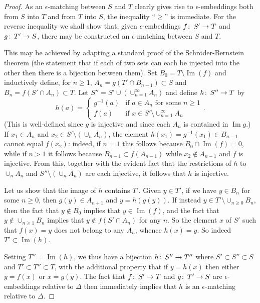 \documentclass[11pt]{amsart}
\theoremstyle{definition}
\theoremstyle{remark}
\numberwithin{equation}{section}
\def\co{\colon\thinspace}
\def\ep{\epsilon}
\DeclareMathOperator{\Img}{Im}
\begin{document}
\begin{proof}
	As an $\ep$-matching between $S$ and $T$ clearly gives rise to $\ep$-embeddings both from $S$ into $T$ and from $T$ into $S$, the inequality ``$\geq$'' is immediate.  For the reverse inequality we shall show that, given $\ep$-embeddings $f\co S'\to T$ and $g\co T'\to S$, there may be constructed an $\ep$-matching between $S$ and $T$.
	
	This may be achieved by adapting a standard proof of the Schr\"oder-Bernstein theorem (the statement that if each of two sets can each be injected into the other then there is a bijection between them). Set $B_0=T\setminus \Img(f)$ and inductively define, for $n\geq 1$, $A_n=g(T'\cap B_{n-1})\subset S$ and $B_n=f(S'\cap A_{n})\subset T$.  Let $S''=S'\cup\left(\cup_{n=1}^{\infty}A_n\right)$ and define $h\co S''\to T$ by \[ h(a)=\left\{\begin{array}{ll} g^{-1}(a) & \mbox{if }a\in A_n\mbox{ for some }n\geq 1 \\ f(a) & \mbox{if $x\in S'\setminus\cup_{n=1}^{\infty}A_n$}  \end{array}\right..  \]  (This is well-defined since $g$ is injective and since each $A_n$ is contained in $\Img g$.)   If $x_1\in A_n$ and $x_2\in S'\setminus(\cup_n A_n)$, the element $h(x_1)=g^{-1}(x_1)\in B_{n-1}$ cannot equal $f(x_2)$: indeed, if $n=1$ this follows because $B_0\cap \Img(f)=0$, while if $n>1$ it follows because $B_{n-1}\subset f(A_{n-1})$ while $x_2\notin A_{n-1}$ and $f$ is injective.  From this, together with the evident fact that the restrictions of $h$ to $\cup_n A_n$ and $S''\setminus(\cup_nA_n)$ are  each  injective, it follows that $h$ is injective.   
	
	Let us show that the image of $h$ contains $T'$.	
	Given $y\in T'$, if we have $y\in B_n$ for some $n\geq 0$, then  $g(y)\in A_{n+1}$ and $y=h(g(y))$.  If instead $y\in T'\setminus\cup_{n\geq 0}B_n$, then the fact that $y\notin B_0$ implies that $y\in \Img(f)$, and the fact that $y\notin \cup_{n\geq 1}B_n$ implies that $y\notin f(S'\cap A_n)$ for any $n$. So the element $x$ of $S'$ such that $f(x)=y$ does not belong to any $A_n$, whence $h(x)=y$.  So indeed $T'\subset \Img(h)$.
	
	Setting $T''=\Img(h)$, we thus have a bijection $h\co S''\to T''$ where $S'\subset S''\subset S$ and $T'\subset T''\subset T$, with the additional property that if $y=h(x)$ then either $y=f(x)$ or $x=g(y)$.  The fact that $f\co S'\to T$ and $g\co T'\to S$ are $\ep$-embeddings relative to $\Delta$ then immediately implies that $h$ is an $\ep$-matching relative to $\Delta$.
	\end{proof}
\end{document}
